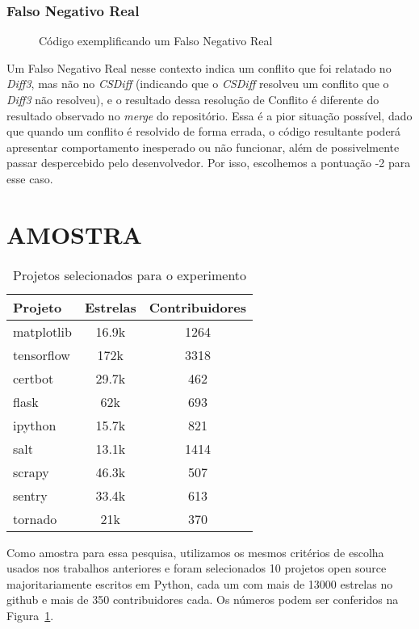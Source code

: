 \subsubsection{Falso Negativo Real}
\begin{figure}[ht]
	\begin{center}
		
		\caption{Código exemplificando um Falso Negativo Real}\label{falso_negativo_real}
	\end{center}
\end{figure}

Um Falso Negativo Real nesse contexto indica um conflito que foi relatado no
\emph{Diff3}, mas não no \emph{CSDiff} (indicando que o \emph{CSDiff} resolveu
um conflito que o \emph{Diff3} não resolveu), e o resultado dessa resolução de
Conflito é diferente do resultado observado no \emph{merge} do repositório.
Essa é a pior situação possível, dado que quando um conflito é resolvido de
forma errada, o código resultante poderá apresentar comportamento inesperado ou
não funcionar, além de possivelmente passar despercebido pelo desenvolvedor.
Por isso, escolhemos a pontuação -2 para esse caso.

\section{AMOSTRA}

\begin{table}[ht]
	\begin{center}
		\begin{tabular}{|l|c|c|}
			\hline
			\textbf{Projeto} & \textbf{Estrelas} & \textbf{Contribuidores} \\
			\hline
			matplotlib       & 16.9k             & 1264                    \\
			tensorflow       & 172k              & 3318                    \\
			certbot          & 29.7k             & 462                     \\
			flask            & 62k               & 693                     \\
			ipython          & 15.7k             & 821                     \\
			salt             & 13.1k             & 1414                    \\
			scrapy           & 46.3k             & 507                     \\
			sentry           & 33.4k             & 613                     \\
			tornado          & 21k               & 370                     \\
			\hline
		\end{tabular}
	\end{center}
	\caption{Projetos selecionados para o experimento}\label{tabela_projeto}
\end{table}
Como amostra para essa pesquisa, utilizamos os mesmos critérios de escolha
usados nos trabalhos anteriores e foram selecionados 10 projetos open source
majoritariamente escritos em Python, cada um com mais de 13000 estrelas no
github e mais de 350 contribuidores cada. Os números podem ser conferidos na
Figura~\ref{tabela_projeto}.

